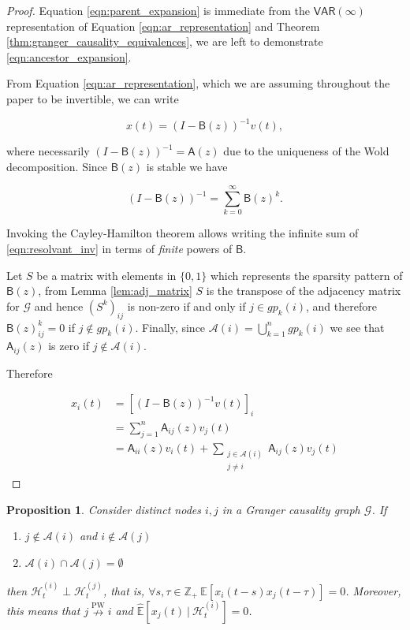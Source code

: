 \documentclass{statsoc}
\def\npwgc{\overset{\text{PW}}{\nrightarrow}}  %
\def\gcg{\mathcal{G}}  %
\def\VAR{\mathsf{VAR}}  %
\def\B{\mathsf{B}}  %
\def\A{\mathsf{A}}  %
\def\H{\mathcal{H}}  %
\newcommand{\linE}[2]{\hat{\E}[#1\ |\ #2]}  %
\newcommand{\anc}[1]{\mathcal{A}(#1)}  %
\newcommand{\gpn}[2]{gp_{#1}(#2)}  %
\newtheorem{proposition}{Proposition}
\def\H{\mathcal{H}}  %
\def\E{\mathbb{E}}  %
\def\Z{\mathbb{Z}}  %
\begin{document}
\begin{proof}
  Equation \eqref{eqn:parent_expansion} is immediate from the
  $\VAR(\infty)$ representation of Equation \eqref{eqn:ar_representation}
  and Theorem \ref{thm:granger_causality_equivalences}, we are left to
  demonstrate \eqref{eqn:ancestor_expansion}.
  
  From Equation \eqref{eqn:ar_representation}, which we are assuming
  throughout the paper to be invertible, we can write

  \begin{equation*}
    x(t) = (I - \B(z))^{-1} v(t),
  \end{equation*}

  where necessarily $(I - \B(z))^{-1} = \A(z)$ due to the uniqueness
  of the Wold decomposition.  Since $\B(z)$ is stable we have

  \begin{equation}
    \label{eqn:resolvant_inv}
    (I - \B(z))^{-1} = \sum_{k = 0}^\infty \B(z)^k.
  \end{equation}

  Invoking the Cayley-Hamilton theorem allows writing the infinite sum
  of \eqref{eqn:resolvant_inv} in terms of \textit{finite} powers of
  $\B$.

  Let $S$ be a matrix with elements in $\{0, 1\}$ which represents the
  sparsity pattern of $\B(z)$, from Lemma \ref{lem:adj_matrix} $S$ is
  the transpose of the adjacency matrix for $\gcg$ and hence
  $(S^k)_{ij}$ is non-zero if and only if $j \in \gpn{k}{i}$, and
  therefore $\B(z)^k_{ij} = 0$ if $j \not \in \gpn{k}{i}$.  Finally,
  since $\anc{i} = \bigcup_{k = 1}^n\gpn{k}{i}$ we see that
  $\A_{ij}(z)$ is zero if $j \not\in \anc{i}$.

  Therefore

  \begin{align*}
    x_i(t) &= [(I - \B(z))^{-1}v(t)]_i\\
           &= \sum_{j = 1}^n \A_{ij}(z) v_j(t)\\
           &= \A_{ii}(z) v_i(t) + \sum_{\substack{j \in \anc{i} \\ j \ne i}} \A_{ij}(z) v_j(t)
  \end{align*}
\end{proof}

\begin{proposition}
  \label{prop:separated_ancestor_uncorrelated}
  Consider distinct nodes $i, j$ in a Granger causality graph
  $\gcg$.  If

  \begin{enumerate}[label=(\alph*)]
  \item{$j \not\in \anc{i}$ and $i \not\in \anc{j}$}
  \item{$\anc{i}\cap\anc{j} = \emptyset$}
  \end{enumerate}

  then $\H_t^{(i)} \perp \H_t^{(j)}$, that is,
  $\forall s, \tau \in \Z_+\ \E[x_i(t - s)x_j(t - \tau)] = 0$.  Moreover,
  this means that $j \npwgc i$ and $\linE{x_j(t)}{\H_t^{(i)}} = 0$.
\end{proposition}
\end{document}
